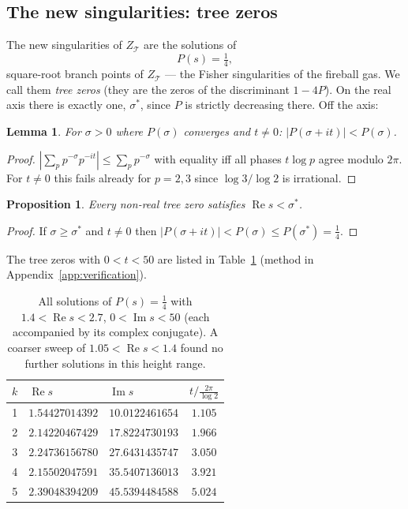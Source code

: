 \documentclass[11pt]{article}
\newcommand{\cT}{\mathcal{T}}   %
\numberwithin{equation}{section}
\theoremstyle{plain}
\newtheorem{proposition}[theorem]{Proposition}
\newtheorem{lemma}[theorem]{Lemma}
\theoremstyle{definition}
\theoremstyle{remark}
\begin{document}
\subsection{The new singularities: tree zeros}

The new singularities of $Z_\cT$ are the solutions of
\begin{equation}\label{eq:treezero}
P(s) = \tfrac14,
\end{equation}
square-root branch points of $Z_\cT$ --- the Fisher singularities of the fireball gas.
We call them \emph{tree zeros} (they are the zeros of the discriminant $1 - 4P$). On
the real axis there is exactly one, $\sigma^{*}$, since $P$ is strictly decreasing
there. Off the axis:

\begin{lemma}\label{lem:strict}
For $\sigma > 0$ where $P(\sigma)$ converges and $t \neq 0$:
$|P(\sigma + it)| < P(\sigma)$.
\end{lemma}

\begin{proof}
$|\sum_p p^{-\sigma} p^{-it}| \le \sum_p p^{-\sigma}$ with equality iff all phases
$t \log p$ agree modulo $2\pi$. For $t \ne 0$ this fails already for $p = 2, 3$ since
$\log 3/\log 2$ is irrational.
\end{proof}

\begin{proposition}\label{prop:strip}
Every non-real tree zero satisfies $\operatorname{Re} s < \sigma^{*}$.
\end{proposition}

\begin{proof}
If $\sigma \ge \sigma^{*}$ and $t \neq 0$ then
$|P(\sigma+it)| < P(\sigma) \le P(\sigma^{*}) = \tfrac14$.
\end{proof}

The tree zeros with $0 < t < 50$ are listed in Table~\ref{tab:zeros} (method in
Appendix~\ref{app:verification}).

\begin{table}[ht]
\centering
\begin{tabular}{@{}cllc@{}}
\toprule
$k$ & $\operatorname{Re} s$ & $\operatorname{Im} s$ & $t \big/ \tfrac{2\pi}{\log 2}$ \\
\midrule
1 & $1.54427014392$ & $10.0122461654$ & $1.105$ \\
2 & $2.14220467429$ & $17.8224730193$ & $1.966$ \\
3 & $2.24736156780$ & $27.6431435747$ & $3.050$ \\
4 & $2.15502047591$ & $35.5407136013$ & $3.921$ \\
5 & $2.39048394209$ & $45.5394484588$ & $5.024$ \\
\bottomrule
\end{tabular}
\caption{All solutions of $P(s) = \tfrac14$ with $1.4 < \operatorname{Re} s < 2.7$,
$0 < \operatorname{Im} s < 50$ (each accompanied by its complex conjugate). A coarser
sweep of $1.05 < \operatorname{Re} s < 1.4$ found no further solutions in this height
range.}
\label{tab:zeros}
\end{table}
\end{document}
